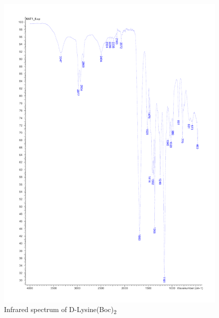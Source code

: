 \begin{figure}[ht!]
\centering
\includegraphics[scale=0.6]{IR/KAT1_5.pdf}
\caption{Infrared spectrum of D-Lysine(Boc)\textsubscript{2}}
\end{figure}

